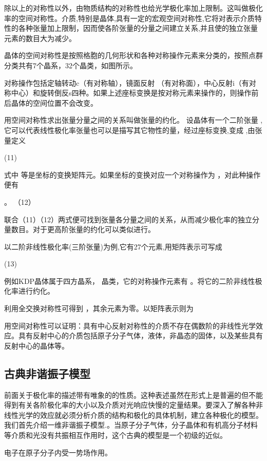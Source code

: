 除以上的对称性以外，由物质结构的对称性也给光学极化率加上限制。这叫做极化率的空间对称性。介质,特别是晶体,具有一定的宏观空间对称性,它将对表示介质特性的各种张量加上限制，因而使各阶张量的分量之间建立关系,并且使的独立张量元素的数目大为减少。

晶体的空间对称性是按照格胞的几何形状和各种对称操作元素来分类的，按照点群分类共有7个晶系，32个晶类，如图所示。
       
对称操作包括定轴转动c（有对称轴），镜面反射 （有对称面），中心反射i（有对称中心）和旋转倒反s四种。如果上述座标变换是按对称元素来操作的，则操作前后晶体的空间位置不会改变。

用空间对称性求出张量分量之间的关系叫做张量的约化。  设晶体有一个二阶张量 ,它可以代表线性极化率张量也可以是描写其它物性的量，经过座标变换,变成 ,由张量定义

                                                     (11)

式中 等是坐标的变换矩阵元。如果坐标的变换对应一个对称操作为 ，对此种操作便有

                    。                                            （12）

联合（11）（12）两式便可找到张量各分量之间的关系，从而减少极化率的独立分量数目。对于更高阶张量的约化可以类似进行。

以二阶非线性极化率(三阶张量)为例,它有27个元素,用矩阵表示可写成

          (13)

例如KDP晶体属于四方晶系， 晶类，它的对称操作元素有 。将它的二阶非线性极化率进行约化。

                   
利用全交换对称性可得到 ，其余元素为零。以矩阵表示则为
          
用空间对称性可以证明：具有中心反射对称性的介质不存在偶数阶的非线性光学效应。具有反射中心的介质包括原子分子气体，液体，非晶态的固体，以及某些具有反射中心的晶体等。

\subsection{古典非谐振子模型}
前面关于极化率的描述带有唯象的的性质。这种表述虽然在形式上是普遍的但不能得到有关各阶极化率的大小以及介质对光响应快慢的定量结果。要深入了解各种非线性光学的效应就必须分析介质的结构和极化的具体机制，建立各种极化的模型。我们首先介绍一维非谐振子模型.。当原子分子气体，分子晶体和有机高分子材料等介质和光没有共振相互作用时，这个古典的模型是一个初级的近似。

电子在原子分子内受一势场作用。
 
